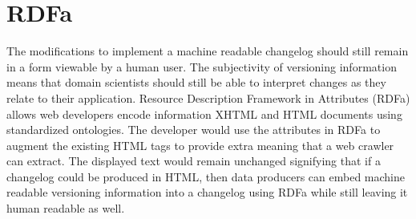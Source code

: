 \section{RDFa}

The modifications to implement a machine readable changelog should still remain in a form viewable by a human user.
The subjectivity of versioning information means that domain scientists should still be able to interpret changes as they relate to their application.
Resource Description Framework in Attributes (RDFa) allows web developers encode information XHTML and HTML documents using standardized ontologies.
The developer would use the attributes in RDFa to augment the existing HTML tags to provide extra meaning that a web crawler can extract.
The displayed text would remain unchanged signifying that if a changelog could be produced in HTML, then data producers can embed machine readable versioning information into a changelog using RDFa while still leaving it human readable as well.


